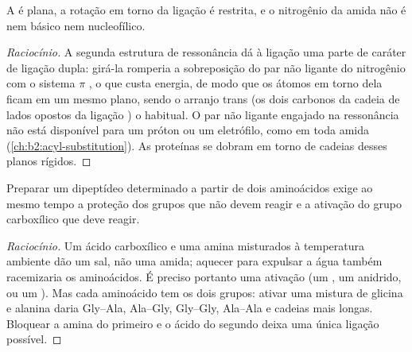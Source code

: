 \begin{proposition}\label{prop:b2:biomolecules:planar}
A  é plana, a rotação em torno da ligação  é restrita, e o nitrogênio da amida
não é nem básico nem nucleofílico.
\end{proposition}

\begin{proof}[Raciocínio]
A segunda estrutura de ressonância dá à ligação  uma parte de caráter de ligação dupla: girá-la
romperia a sobreposição do par não ligante do nitrogênio com o sistema $\pi$ , o que custa
energia, de modo que os átomos em torno dela ficam em um mesmo plano, sendo o arranjo trans (os dois
carbonos da cadeia de lados opostos da ligação ) o habitual. O par não ligante engajado na
ressonância não está disponível para um próton ou um eletrófilo, como em toda amida
(\cref{ch:b2:acyl-substitution}). As proteínas se dobram em torno de cadeias desses planos rígidos.
\end{proof}

\begin{proposition}\label{prop:b2:biomolecules:coupling}
Preparar um dipeptídeo determinado a partir de dois aminoácidos exige ao mesmo tempo a proteção dos
grupos que não devem reagir e a ativação do grupo carboxílico que deve reagir.
\end{proposition}

\begin{proof}[Raciocínio]
Um ácido carboxílico e uma amina misturados à temperatura ambiente dão um sal, não uma amida; aquecer
para expulsar a água também racemizaria os aminoácidos. É preciso portanto uma ativação (um , um anidrido, ou um ). Mas cada aminoácido tem os dois grupos: ativar uma
mistura de glicina e alanina daria Gly--Ala, Ala--Gly, Gly--Gly, Ala--Ala e cadeias mais longas. Bloquear
a amina do primeiro e o ácido do segundo deixa uma única ligação possível.
\end{proof}

